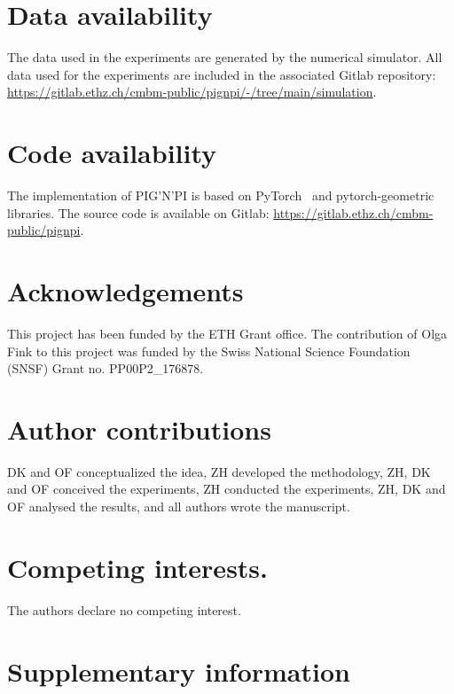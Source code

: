 \documentclass{article}
\newcommand{\pignpi}{PIG'N'PI\xspace}
\begin{document}

\section{Data availability}
The data used in the experiments are generated by the numerical simulator. All data used for the experiments are included in the associated Gitlab repository: \url{https://gitlab.ethz.ch/cmbm-public/pignpi/-/tree/main/simulation}.

\section{Code availability}
The implementation of \pignpi is based on PyTorch~\cite{paszke2017automatic} and pytorch-geometric~\cite{fey2019fast} libraries. The source code is available on Gitlab: \url{https://gitlab.ethz.ch/cmbm-public/pignpi}.

\section{Acknowledgements}
{This project has been funded by the ETH Grant office. The contribution of Olga Fink to this project was funded by the Swiss National Science Foundation (SNSF) Grant no. PP00P2\_176878.}

\section{Author contributions}
{DK and OF conceptualized the idea, ZH developed the methodology, ZH, DK and OF conceived the experiments, ZH conducted the experiments, ZH, DK and OF analysed the results, and all authors wrote the manuscript.}

\section{Competing interests.}
{The authors declare no competing interest.}






\appendix

\clearpage
\section{Supplementary information}
\end{document}
